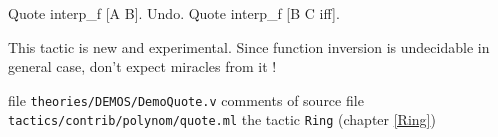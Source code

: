 \begin{coq_example}
Quote interp_f [A B]. 
Undo. Quote interp_f [B C iff]. 
\end{coq_example}

\Warning  This tactic is new and experimental. Since function inversion
is undecidable in general case, don't expect miracles from it !

\SeeAlso file \texttt{theories/DEMOS/DemoQuote.v}
\SeeAlso comments of source file \texttt{tactics/contrib/polynom/quote.ml}
\SeeAlso the tactic \texttt{Ring} (chapter \ref{Ring})


